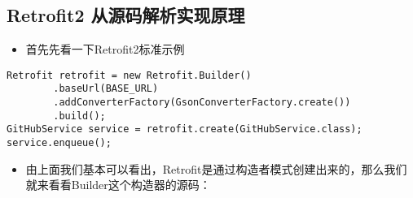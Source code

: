 \documentclass[9pt, b5paper]{article}
\begin{document}
\subsection{Retrofit2 从源码解析实现原理}
\label{sec-1-3}
\begin{itemize}
\item 首先先看一下Retrofit2标准示例
\end{itemize}
\begin{verbatim}
Retrofit retrofit = new Retrofit.Builder()
        .baseUrl(BASE_URL)
        .addConverterFactory(GsonConverterFactory.create())
        .build();
GitHubService service = retrofit.create(GitHubService.class);
service.enqueue();
\end{verbatim}
\begin{itemize}
\item 由上面我们基本可以看出，Retrofit是通过构造者模式创建出来的，那么我们就来看看Builder这个构造器的源码：
\end{itemize}
\end{document}
